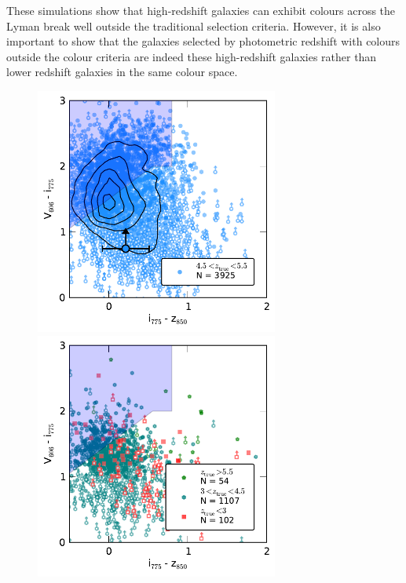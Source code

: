 These simulations show that high-redshift galaxies can exhibit colours across the Lyman break well outside the traditional selection criteria. However, it is also important to show that the galaxies selected by photometric redshift with colours outside the colour criteria are indeed these high-redshift galaxies rather than lower redshift galaxies in the same colour space.

\begin{figure}
\centering
\includegraphics[width=80mm]{plots/figA2a.pdf}
\includegraphics[width=80mm]{plots/figA2b.pdf}

\end{figure}
